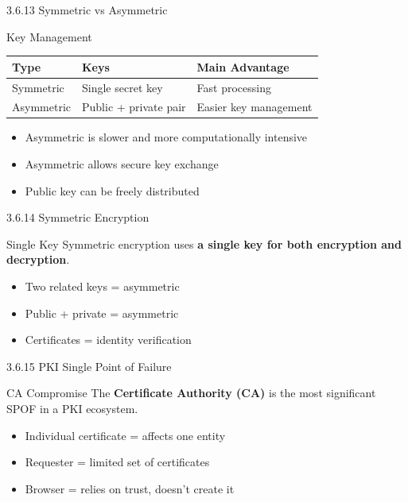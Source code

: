 \documentclass{beamer}
\begin{document}
	\begin{frame}{3.6.13 Symmetric vs Asymmetric}
		\begin{block}{Key Management}
			\begin{tabular}{|p{2.5cm}|p{4cm}|p{4.5cm}|}
				\hline
				\textbf{Type} & \textbf{Keys} & \textbf{Main Advantage} \\
				\hline
				Symmetric & Single secret key & Fast processing \\
				\hline
				Asymmetric & Public + private pair & Easier key management \\
				\hline
			\end{tabular}
		\end{block}
		\begin{itemize}
			\item Asymmetric is slower and more computationally intensive
			\item Asymmetric allows secure key exchange
			\item Public key can be freely distributed
		\end{itemize}
	\end{frame}
	
	\begin{frame}{3.6.14 Symmetric Encryption}
		\begin{block}{Single Key}
			Symmetric encryption uses \textbf{a single key for both encryption and decryption}.
		\end{block}
		\begin{itemize}
			\item Two related keys = asymmetric
			\item Public + private = asymmetric
			\item Certificates = identity verification
		\end{itemize}
	\end{frame}
	
	\begin{frame}{3.6.15 PKI Single Point of Failure}
		\begin{block}{CA Compromise}
			The \textbf{Certificate Authority (CA)} is the most significant SPOF in a PKI ecosystem.
		\end{block}
		\begin{itemize}
			\item Individual certificate = affects one entity
			\item Requester = limited set of certificates
			\item Browser = relies on trust, doesn't create it
		\end{itemize}
	\end{frame}
	
\end{document}
